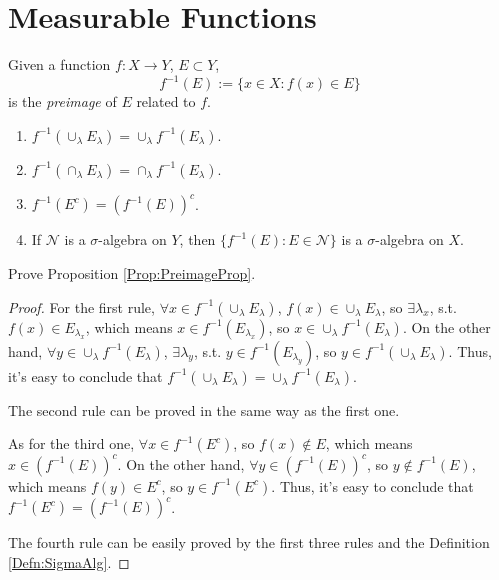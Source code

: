 \section{Measurable Functions}
\begin{defn}
    \label{Def:Preimage}
    Given a function $f:X\rightarrow Y$, $E\subset Y$, 
    \begin{displaymath}
        f^{-1}(E):=\{x\in X:f(x)\in E\}
    \end{displaymath}
    is the \textit{preimage} of $E$ related to $f$.
\end{defn}
\begin{prop}
    \label{Prop:PreimageProp}
    \begin{enumerate}
        \item $f^{-1}(\cup_{\lambda}E_{\lambda})
        =\cup_{\lambda}f^{-1}(E_{\lambda})$. 
        \item $f^{-1}(\cap_{\lambda}E_{\lambda})
        =\cap_{\lambda}f^{-1}(E_{\lambda})$.
        \item $f^{-1}(E^c)=(f^{-1}(E))^{c}$.
        \item If $\mathcal{N}$ is a $\sigma$-algebra on $Y$, 
        then $\{f^{-1}(E):E\in\mathcal{N}\}$ is a 
        $\sigma$-algebra on $X$.
    \end{enumerate}
\end{prop}
\begin{exc}
    Prove Proposition \ref{Prop:PreimageProp}.
\end{exc}
\begin{proof}
    For the first rule, $\forall x\in f^{-1}(\cup_{\lambda}E_{\lambda})$,
    $f(x)\in\cup_{\lambda}E_{\lambda}$, so $\exists \lambda_x$, s.t.
    $f(x)\in E_{\lambda_x}$, which means $x\in f^{-1}(E_{\lambda_x})$,
    so $x\in \cup_{\lambda}f^{-1}(E_{\lambda})$. On the other hand,
    $\forall y\in\cup_{\lambda}f^{-1}(E_{\lambda})$, 
    $\exists \lambda_y$, s.t. $y\in f^{-1}(E_{\lambda_y})$,
    so $y\in f^{-1}(\cup_{\lambda}E_{\lambda})$. 
    Thus, it's easy to conclude that  
    $f^{-1}(\cup_{\lambda}E_{\lambda})
    =\cup_{\lambda}f^{-1}(E_{\lambda})$.

    The second rule can be proved in the same way as the first one.

    As for the third one, $\forall x\in f^{-1}(E^c)$, so $f(x)\notin E$,
    which means $x\in(f^{-1}(E))^{c}$. On the other hand,
    $\forall y\in(f^{-1}(E))^{c}$, so $y\notin f^{-1}(E)$,
    which means $f(y)\in E^c$, so $y\in f^{-1}(E^c)$.
    Thus, it's easy to conclude that $f^{-1}(E^c)=(f^{-1}(E))^{c}$.

    The fourth rule can be easily proved by the first three rules
    and the Definition \ref{Defn:SigmaAlg}.
\end{proof}
